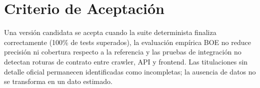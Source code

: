\section{Criterio de Aceptación}
Una versión candidata se acepta cuando la suite determinista finaliza correctamente (100\% de tests superados), la evaluación empírica BOE no reduce precisión ni cobertura respecto a la referencia y las pruebas de integración no detectan roturas de contrato entre crawler, API y frontend. Las titulaciones sin detalle oficial permanecen identificadas como incompletas; la ausencia de datos no se transforma en un dato estimado.
